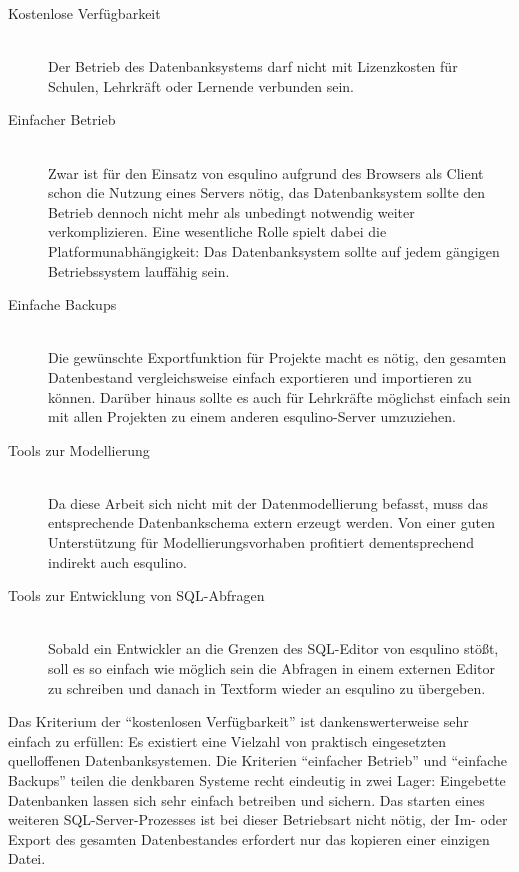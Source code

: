 \begin{description}  
\item[Kostenlose Verfügbarkeit] \hfill \\
  Der Betrieb des Datenbanksystems darf nicht mit Lizenzkosten für Schulen, Lehrkräft oder Lernende verbunden sein.
\item[Einfacher Betrieb] \hfill \\
  Zwar ist für den Einsatz von esqulino aufgrund des Browsers als Client schon die Nutzung eines Servers nötig, das Datenbanksystem sollte den Betrieb dennoch nicht mehr als unbedingt notwendig weiter verkomplizieren. Eine wesentliche Rolle spielt dabei die Platformunabhängigkeit: Das Datenbanksystem sollte auf jedem gängigen Betriebssystem lauffähig sein.  
\item[Einfache Backups] \hfill \\
  Die gewünschte Exportfunktion für Projekte macht es nötig, den gesamten Datenbestand vergleichsweise einfach exportieren und importieren zu können. Darüber hinaus sollte es auch für Lehrkräfte möglichst einfach sein mit allen Projekten zu einem anderen esqulino-Server umzuziehen.
\item[Tools zur Modellierung] \hfill \\
  Da diese Arbeit sich nicht mit der Datenmodellierung befasst, muss das entsprechende Datenbankschema extern erzeugt werden. Von einer guten Unterstützung für Modellierungsvorhaben profitiert dementsprechend indirekt auch esqulino.
\item[Tools zur Entwicklung von SQL-Abfragen] \hfill \\
  Sobald ein Entwickler an die Grenzen des SQL-Editor von esqulino stößt, soll es so einfach wie möglich sein die Abfragen in einem externen Editor zu schreiben und danach in Textform wieder an esqulino zu übergeben.
\end{description}

Das Kriterium der ``kostenlosen Verfügbarkeit'' ist dankenswerterweise sehr einfach zu erfüllen: Es existiert eine Vielzahl von praktisch eingesetzten quelloffenen Datenbanksystemen. Die Kriterien ``einfacher Betrieb'' und ``einfache Backups'' teilen die denkbaren Systeme recht eindeutig in zwei Lager: Eingebette Datenbanken lassen sich sehr einfach betreiben und sichern. Das starten eines weiteren SQL-Server-Prozesses ist bei dieser Betriebsart nicht nötig, der Im- oder Export des gesamten Datenbestandes erfordert nur das kopieren einer einzigen Datei.


